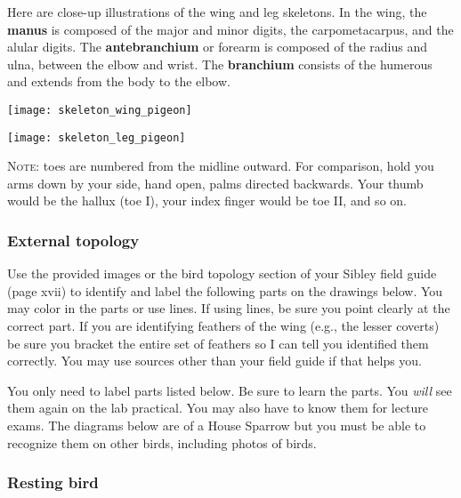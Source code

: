 \documentclass[10pt]{article}
\begin{document}
Here are close-up illustrations of the wing and leg skeletons.  In the wing, the \textbf{manus} is composed of the major and minor digits, the carpometacarpus, and the alular digits. The \textbf{antebranchium} or forearm is composed of the radius and ulna, between the elbow and wrist. The \textbf{branchium} consists of the humerous and extends from the body to the elbow.

\texttt{[image: skeleton\_wing\_pigeon]}

\vfill

\begin{center}
	\texttt{[image: skeleton\_leg\_pigeon]}
\end{center}

\textsc{Note:} toes are numbered from the midline outward. For comparison, hold you arms down by your side, hand open, palms directed backwards. Your thumb would be the hallux (toe I), your index finger would be toe II, and so on.

\newpage

\subsubsection*{External topology}

Use the provided images or the bird topology section of your Sibley field guide (page xvii) to identify and label the following parts on the drawings below. You may color in the parts or use lines. If using lines, be sure you point clearly at the correct part. If you are identifying feathers of the wing (e.g., the lesser coverts) be sure you bracket the entire set of feathers so I can tell you identified them correctly. You may use sources other than your field guide if that helps you. 
 
You only need to label parts listed below. Be sure to learn the parts. You \emph{will} see them again on the lab practical. You may also have to know them for lecture exams. The diagrams below are of a House Sparrow but you must be able to recognize them on other birds, including photos of birds.
 


\subsubsection*{Resting bird}
\end{document}
